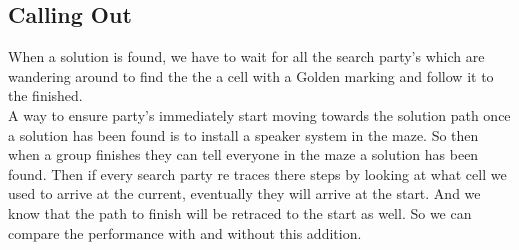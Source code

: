 \documentclass[a4paper, 12pt]{article}
\begin{document}
		\subsection{Calling Out}
			When a solution is found, we have to wait for all the search party's which are wandering around to find the the a cell with a Golden marking and follow it to the finished.\\
			
			A way to ensure party's immediately start moving towards the solution path once a solution has been found is to install a speaker system in the maze. So then when a group finishes they can tell everyone in the maze a solution has been found. Then if every search party re traces there steps by looking at what cell we used to arrive at the current, eventually they will arrive at the start. And we know that the path to finish will be retraced to the start as well. So we can compare the performance with and without this addition.
			
\end{document}
